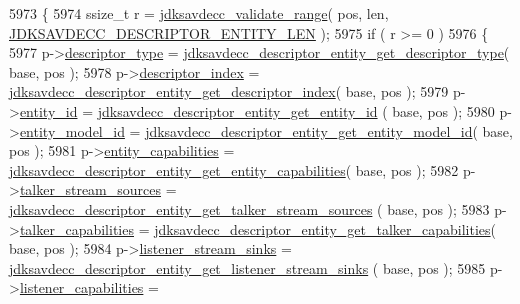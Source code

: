 \begin{DoxyCode}
5973 \{
5974     ssize\_t r = \hyperlink{group__util_ga9c02bdfe76c69163647c3196db7a73a1}{jdksavdecc\_validate\_range}( pos, len, 
      \hyperlink{group__descriptor__entity_ga552cb1772e36c821ac821ba95d69d52b}{JDKSAVDECC\_DESCRIPTOR\_ENTITY\_LEN} );
5975     \textcolor{keywordflow}{if} ( r >= 0 )
5976     \{
5977         p->\hyperlink{structjdksavdecc__descriptor__entity_ab7c32b6c7131c13d4ea3b7ee2f09b78d}{descriptor\_type} = 
      \hyperlink{group__descriptor__entity_gaeef6a94b5953b7190847caa00604ad3f}{jdksavdecc\_descriptor\_entity\_get\_descriptor\_type}( base, pos
       );
5978         p->\hyperlink{structjdksavdecc__descriptor__entity_a042bbc76d835b82d27c1932431ee38d4}{descriptor\_index} = 
      \hyperlink{group__descriptor__entity_gac3bca390b46a5a293a618196102a6a8e}{jdksavdecc\_descriptor\_entity\_get\_descriptor\_index}( base, 
      pos );
5979         p->\hyperlink{structjdksavdecc__descriptor__entity_a26ec635a862a0163fe5b1ff90b5f4885}{entity\_id} = \hyperlink{group__descriptor__entity_gaca5b3db8c858e90e061827623fa14c76}{jdksavdecc\_descriptor\_entity\_get\_entity\_id}
      ( base, pos );
5980         p->\hyperlink{structjdksavdecc__descriptor__entity_a2d1d52d1ec5c6100b61acf3daa452c56}{entity\_model\_id} = 
      \hyperlink{group__descriptor__entity_ga384de8652064d5c9e95640a0a30a09ef}{jdksavdecc\_descriptor\_entity\_get\_entity\_model\_id}( base, pos
       );
5981         p->\hyperlink{structjdksavdecc__descriptor__entity_ae3350328f131c8382ba5030939a2a484}{entity\_capabilities} = 
      \hyperlink{group__descriptor__entity_ga647cba8fff98e97e9b88b2cce47f2864}{jdksavdecc\_descriptor\_entity\_get\_entity\_capabilities}( 
      base, pos );
5982         p->\hyperlink{structjdksavdecc__descriptor__entity_a9bd7d7b8ebd60d782a8b2be740355a37}{talker\_stream\_sources} = 
      \hyperlink{group__descriptor__entity_gabef6a9081299ffcd6ab0f1b2f279078e}{jdksavdecc\_descriptor\_entity\_get\_talker\_stream\_sources}
      ( base, pos );
5983         p->\hyperlink{structjdksavdecc__descriptor__entity_a51f25c5187ed3f58d17c11e1dc0f3352}{talker\_capabilities} = 
      \hyperlink{group__descriptor__entity_ga6e9408d48ca7143f7f6a91d5edfdca64}{jdksavdecc\_descriptor\_entity\_get\_talker\_capabilities}( 
      base, pos );
5984         p->\hyperlink{structjdksavdecc__descriptor__entity_aacb4d50f4068a0a36c8746e0571bf53b}{listener\_stream\_sinks} = 
      \hyperlink{group__descriptor__entity_ga636fbd56265c94584e11e7e7635808da}{jdksavdecc\_descriptor\_entity\_get\_listener\_stream\_sinks}
      ( base, pos );
5985         p->\hyperlink{structjdksavdecc__descriptor__entity_a3323f8a756edef6c94b10e2ab6c962ee}{listener\_capabilities} = 

\end{DoxyCode}
